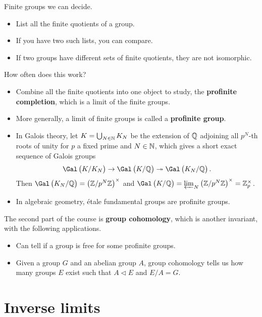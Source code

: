 Finite groups we can decide.
\begin{itemize}
\item List all the finite quotients of a group.
\item If you have two such lists, you can compare.
\item If two groups have different sets of finite quotients, they are not isomorphic.
\end{itemize}
How often does this work?
\begin{itemize}
\item Combine all the finite quotients into one object to study, the \textbf{profinite completion}, which is a limit of the finite groups.
\item More generally, a limit of finite groups is called a \textbf{profinite group}.
\end{itemize}

\begin{example}
\hfill
\begin{itemize}
\item In Galois theory, let $ K = \bigcup_{N \in \mathbb{N}} K_N $ be the extension of $ \mathbb{Q} $ adjoining all $ p^N $-th roots of unity for $ p $ a fixed prime and $ N \in \mathbb{N} $, which gives a short exact sequence of Galois groups
$$ \Gal\br{K / K_N} \to \Gal\br{K / \QQ} \twoheadrightarrow \Gal\br{K_N / \QQ}. $$
Then $ \Gal\br{K_N / \QQ} = \br{\ZZ / p^N\ZZ}^\times $ and $ \Gal\br{K / \QQ} = \varprojlim_N \br{\ZZ / p^N\ZZ}^\times = \ZZ_p^\times $.
\item In algebraic geometry, \'etale fundamental groups are profinite groups.
\end{itemize}
\end{example}

The second part of the course is \textbf{group cohomology}, which is another invariant, with the following applications.
\begin{itemize}
\item Can tell if a group is free for some profinite groups.
\item Given a group $ G $ and an abelian group $ A $, group cohomology tells us how many groups $ E $ exist such that $ A \triangleleft E $ and $ E / A = G $.
\end{itemize}

\pagebreak

\section{Inverse limits}

